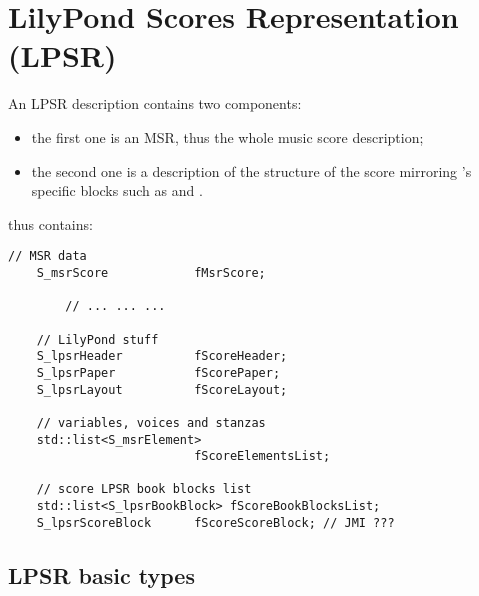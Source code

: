 



\chapter{LilyPond Scores Representation (LPSR)}


An LPSR description contains two components:
\begin{itemize}
\item the first one is an MSR, thus the whole music score description;
\item the second one is a description of the structure of the score mirroring \lily's specific blocks such as  and .
\end{itemize}

 thus contains:
\begin{lstlisting}[language=CPlusPlus]
    // MSR data
    S_msrScore            fMsrScore;

		// ... ... ...

    // LilyPond stuff
    S_lpsrHeader          fScoreHeader;
    S_lpsrPaper           fScorePaper;
    S_lpsrLayout          fScoreLayout;

    // variables, voices and stanzas
    std::list<S_msrElement>
                          fScoreElementsList;

    // score LPSR book blocks list
    std::list<S_lpsrBookBlock> fScoreBookBlocksList;
    S_lpsrScoreBlock      fScoreScoreBlock; // JMI ???
\end{lstlisting}

\section{LPSR basic types}\label{LPSR basic types}

